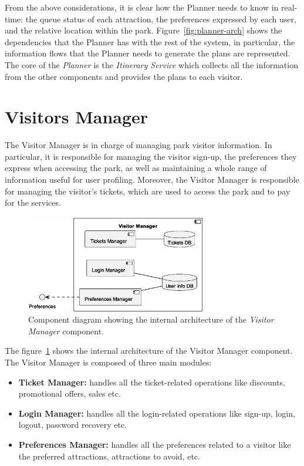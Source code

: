 From the above considerations, it is clear how the Planner needs to know in real-time: the queue status of each attraction, the preferences expressed
by each user, and the relative location within the park. Figure~\ref{fig:planner-arch} shows the dependencies that the Planner has with the rest of
the system, in particular, the information flows that the Planner needs to generate the plans are represented. The core of the \textit{Planner} is
the \textit{Itinerary Service} which collects all the information from the other components and provides the plans to each visitor.

\section{Visitors Manager}

The Visitor Manager is in charge of managing park visitor information. In particular, it is responsible for managing the visitor sign-up, the
preferences they express when accessing the park, as well as maintaining a whole range of information useful for user profiling. Moreover, the
Visitor Manager is responsible for managing the visitor's tickets, which are used to access the park and to pay for the services.

\begin{figure}[H]
	\centering
	\includegraphics[width=0.7\textwidth]{img/visitor-manager.eps}
	\caption{Component diagram showing the internal architecture of the \textit{Visitor Manager} component.
	}
	\label{fig:visitor-manager-arch}
\end{figure}

The figure~\ref{fig:visitor-manager-arch} shows the internal architecture of the Visitor Manager component. The Visitor Manager is composed of three
main modules:

\begin{itemize}
	\item \textbf{Ticket Manager:} handles all the ticket-related operations like discounts, promotional offers, sales etc.
	\item \textbf{Login Manager:} handles all the login-related operations like sign-up, login, logout, password recovery etc.
	\item \textbf{Preferences Manager:} handles all the preferences related to a visitor like the preferred attractions, attractions to avoid, etc.
\end{itemize}

